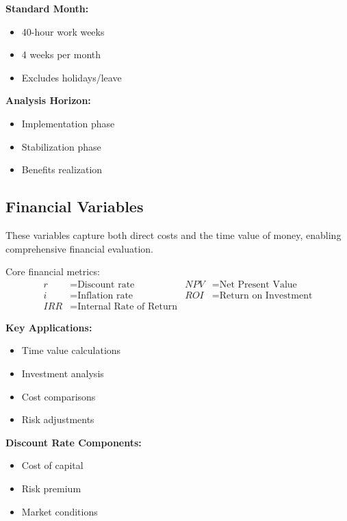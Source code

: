 \documentclass[12pt,a4paper]{article}
\newenvironment{definition}[1]
{\begin{mdframed}[style=definitionstyle,frametitle={Definition: #1}]}
{\end{mdframed}}
\newenvironment{explanation}
{\begin{mdframed}[style=explanationstyle,frametitle={Explanation}]}
{\end{mdframed}}
\begin{document}
\begin{explanation}
\textbf{Standard Month:}
\begin{itemize}
    \item 40-hour work weeks
    \item 4 weeks per month
    \item Excludes holidays/leave
\end{itemize}
\textbf{Analysis Horizon:}
\begin{itemize}
    \item Implementation phase
    \item Stabilization phase
    \item Benefits realization
\end{itemize}
\end{explanation}

\subsection{Financial Variables}
These variables capture both direct costs and the time value of money, enabling comprehensive financial evaluation.

\begin{definition}{Financial Parameters}
Core financial metrics:
\begin{align*}
    r &= \text{Discount rate} & NPV &= \text{Net Present Value} \\
    i &= \text{Inflation rate} & ROI &= \text{Return on Investment} \\
    IRR &= \text{Internal Rate of Return} & &
\end{align*}
\end{definition}

\begin{explanation}
\textbf{Key Applications:}
\begin{itemize}
    \item Time value calculations
    \item Investment analysis
    \item Cost comparisons
    \item Risk adjustments
\end{itemize}
\textbf{Discount Rate Components:}
\begin{itemize}
    \item Cost of capital
    \item Risk premium
    \item Market conditions
\end{itemize}
\end{explanation}
\end{document}
